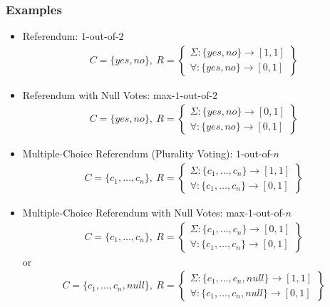 \documentclass[bibtotoc,halfparskip,oneside]{scrreprt}
\begin{document}
	\subsubsection{Examples}
	
	\begin{itemize}
		\item Referendum: $1$-out-of-$2$
		\begin{align*}
			C=\{yes,no\},~ 
			R=\left\{\begin{aligned}\Sigma:\{yes,no\}\rightarrow[1,1] \\ \forall:\{yes,no\}\rightarrow[0,1]\end{aligned}\right\}
		\end{align*}
		
		\item Referendum with Null Votes: max-$1$-out-of-$2$
		\begin{align*}
			C=\{yes,no\},~
			R=\left\{\begin{aligned}\Sigma:\{yes,no\}\rightarrow[0,1] \\ \forall:\{yes,no\}\rightarrow[0,1]\end{aligned}\right\}
		\end{align*}
		
		\item Multiple-Choice Referendum (Plurality Voting): $1$-out-of-$n$
		\begin{align*}
			C=\{c_1,\ldots,c_n\},~ 
			R=\left\{\begin{aligned}\Sigma:\{c_1,\ldots,c_n\}\rightarrow[1,1] \\ \forall:\{c_1,\ldots,c_n\}\rightarrow[0,1]\end{aligned}\right\}
		\end{align*}
		
		\item Multiple-Choice Referendum with Null Votes: max-$1$-out-of-$n$
		\begin{align*}
			C=\{c_1,\ldots,c_n\},~ 
			R=\left\{\begin{aligned}\Sigma:\{c_1,\ldots,c_n\}\rightarrow[0,1] \\ \forall:\{c_1,\ldots,c_n\}\rightarrow[0,1]\end{aligned}\right\}
		\end{align*}
		or
		\begin{align*}
			C=\{c_1,\ldots,c_n,null\},~ 
			R=\left\{\begin{aligned}\Sigma:\{c_1,\ldots,c_n, null\}\rightarrow[1,1] \\ \forall:\{c_1,\ldots,c_n, null\}\rightarrow[0,1]\end{aligned}\right\}
		\end{align*}
		

\end{itemize}
\end{document}
